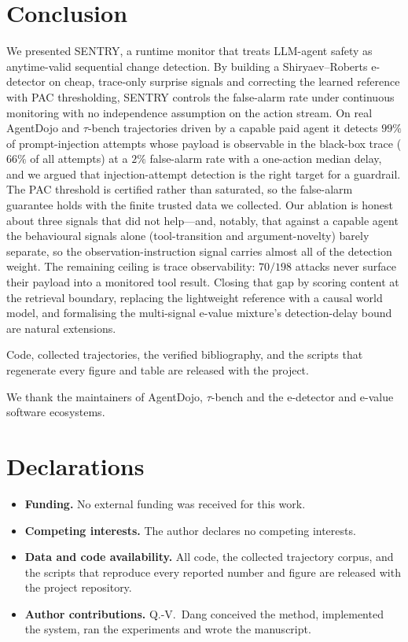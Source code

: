 \documentclass[pdflatex,sn-mathphys-num]{sn-jnl}%
\theoremstyle{thmstyleone}%
\theoremstyle{thmstyletwo}%
\theoremstyle{thmstylethree}%
\begin{document}
\section{Conclusion}\label{sec:conclusion}

We presented SENTRY, a runtime monitor that treats LLM-agent safety as
anytime-valid sequential change detection. By building a Shiryaev--Roberts
e-detector on cheap, trace-only surprise signals and correcting the learned
reference with PAC thresholding, SENTRY controls the false-alarm rate under
continuous monitoring with no independence assumption on the action stream. On
real AgentDojo and \(\tau\)-bench trajectories driven by a capable paid agent
it detects \(99\%\) of prompt-injection attempts whose payload is observable in
the black-box trace (\(66\%\) of all attempts) at a \(2\%\) false-alarm rate
with a one-action median delay, and we argued that injection-attempt detection
is the right target for a guardrail. The PAC threshold is certified rather than
saturated, so the false-alarm guarantee holds with the finite trusted data we
collected. Our ablation is honest about three signals that did not help---and,
notably, that against a capable agent the behavioural signals alone
(tool-transition and argument-novelty) barely separate, so the
observation-instruction signal carries almost all of the detection weight. The
remaining ceiling is trace observability: \(70/198\) attacks never surface
their payload into a monitored tool result. Closing that gap by scoring content
at the retrieval boundary, replacing the lightweight reference with a causal
world model, and formalising the multi-signal e-value mixture's detection-delay
bound are natural extensions.

\backmatter

Code, collected trajectories, the verified bibliography, and the scripts that
regenerate every figure and table are released with the project.

We thank the maintainers of AgentDojo, \(\tau\)-bench and the e-detector and
e-value software ecosystems.

\section*{Declarations}

\begin{itemize}
\item \textbf{Funding.} No external funding was received for this work.
\item \textbf{Competing interests.} The author declares no competing interests.
\item \textbf{Data and code availability.} All code, the collected trajectory
corpus, and the scripts that reproduce every reported number and figure are
released with the project repository.
\item \textbf{Author contributions.} Q.-V.\ Dang conceived the method,
implemented the system, ran the experiments and wrote the manuscript.
\end{itemize}
\end{document}
